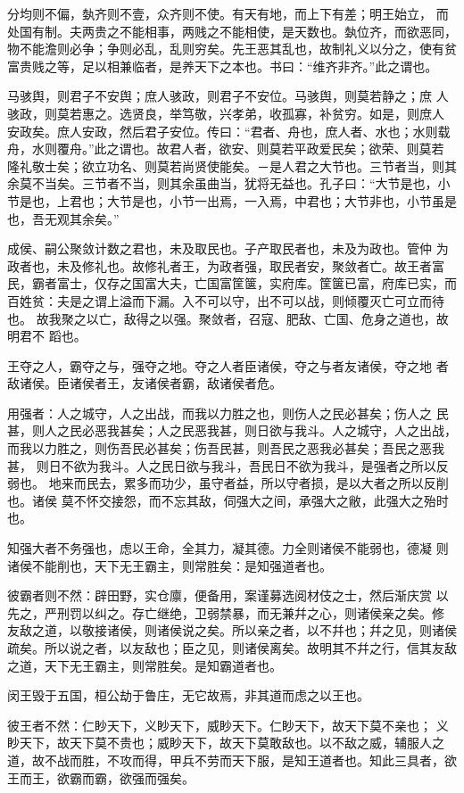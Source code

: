 \documentclass[]{article}
\begin{document}
分均则不偏，埶齐则不壹，众齐则不使。有天有地，而上下有差；明王始立，
而处国有制。夫两贵之不能相事，两贱之不能相使，是天数也。埶位齐，而欲恶同，
物不能澹则必争；争则必乱，乱则穷矣。先王恶其乱也，故制礼义以分之，使有贫
富贵贱之等，足以相兼临者，是养天下之本也。书曰：``维齐非齐。''此之谓也。

马骇舆，则君子不安舆；庶人骇政，则君子不安位。马骇舆，则莫若静之；庶
人骇政，则莫若惠之。选贤良，举笃敬，兴孝弟，收孤寡，补贫穷。如是，则庶人
安政矣。庶人安政，然后君子安位。传曰：``君者、舟也，庶人者、水也；水则载
舟，水则覆舟。''此之谓也。故君人者，欲安、则莫若平政爱民矣；欲荣、则莫若
隆礼敬士矣；欲立功名、则莫若尚贤使能矣。－是人君之大节也。三节者当，则其
余莫不当矣。三节者不当，则其余虽曲当，犹将无益也。孔子曰：``大节是也，小
节是也，上君也；大节是也，小节一出焉，一入焉，中君也；大节非也，小节虽是
也，吾无观其余矣。''

成侯、嗣公聚敛计数之君也，未及取民也。子产取民者也，未及为政也。管仲
为政者也，未及修礼也。故修礼者王，为政者强，取民者安，聚敛者亡。故王者富
民，霸者富士，仅存之国富大夫，亡国富筐箧，实府库。筐箧已富，府库已实，而
百姓贫：夫是之谓上溢而下漏。入不可以守，出不可以战，则倾覆灭亡可立而待也。
故我聚之以亡，敌得之以强。聚敛者，召寇、肥敌、亡国、危身之道也，故明君不
蹈也。

王夺之人，霸夺之与，强夺之地。夺之人者臣诸侯，夺之与者友诸侯，夺之地
者敌诸侯。臣诸侯者王，友诸侯者霸，敌诸侯者危。

用强者：人之城守，人之出战，而我以力胜之也，则伤人之民必甚矣；伤人之
民甚，则人之民必恶我甚矣；人之民恶我甚，则日欲与我斗。人之城守，人之出战，
而我以力胜之，则伤吾民必甚矣；伤吾民甚，则吾民之恶我必甚矣；吾民之恶我甚，
则日不欲为我斗。人之民日欲与我斗，吾民日不欲为我斗，是强者之所以反弱也。
地来而民去，累多而功少，虽守者益，所以守者损，是以大者之所以反削也。诸侯
莫不怀交接怨，而不忘其敌，伺强大之间，承强大之敝，此强大之殆时也。

知强大者不务强也，虑以王命，全其力，凝其德。力全则诸侯不能弱也，德凝
则诸侯不能削也，天下无王霸主，则常胜矣：是知强道者也。

彼霸者则不然：辟田野，实仓廪，便备用，案谨募选阅材伎之士，然后渐庆赏
以先之，严刑罚以纠之。存亡继绝，卫弱禁暴，而无兼幷之心，则诸侯亲之矣。修
友敌之道，以敬接诸侯，则诸侯说之矣。所以亲之者，以不幷也；幷之见，则诸侯
疏矣。所以说之者，以友敌也；臣之见，则诸侯离矣。故明其不幷之行，信其友敌
之道，天下无王霸主，则常胜矣。是知霸道者也。

闵王毁于五国，桓公劫于鲁庄，无它故焉，非其道而虑之以王也。

彼王者不然：仁眇天下，义眇天下，威眇天下。仁眇天下，故天下莫不亲也；
义眇天下，故天下莫不贵也；威眇天下，故天下莫敢敌也。以不敌之威，辅服人之
道，故不战而胜，不攻而得，甲兵不劳而天下服，是知王道者也。知此三具者，欲
王而王，欲霸而霸，欲强而强矣。
\end{document}
